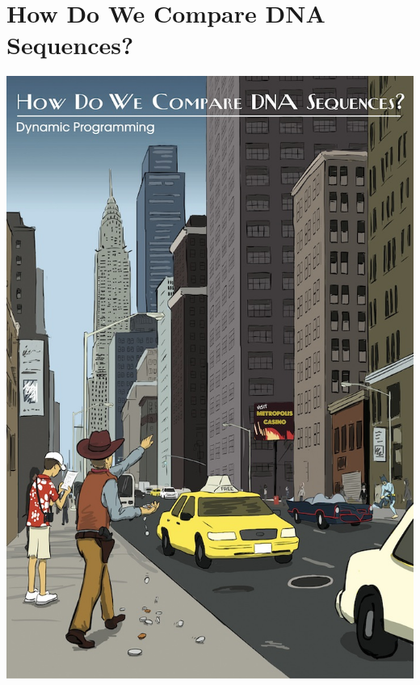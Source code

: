 \documentclass{article}
\begin{document}
\section{How Do We Compare DNA Sequences?\\ }
\begin{center}
    \includegraphics[scale=1.92]{c5/c5.jpg}
\end{center}
\pagebreak
\end{document}
